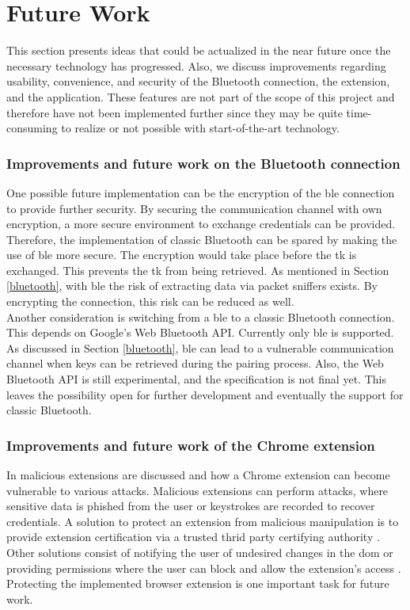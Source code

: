\section{Future Work} \label{futurework}
This section presents ideas that could be actualized in the near future once the necessary technology has progressed. Also, we discuss improvements regarding usability, convenience, and security of the Bluetooth connection, the extension, and the application. These features are not part of the scope of this project and therefore have not been implemented further since they may be quite time-consuming to realize or not possible with start-of-the-art technology.

\subsubsection*{Improvements and future work on the Bluetooth connection}
One possible future implementation can be the encryption of the \gls{ble} connection to provide further security. By securing the communication channel with own encryption, a more secure environment to exchange credentials can be provided. Therefore, the implementation of classic Bluetooth can be spared by making the use of \gls{ble} more secure. The encryption would take place before the \gls{tk} is exchanged. This prevents the \gls{tk} from being retrieved. As mentioned in Section \ref{bluetooth}, with \gls{ble} the risk of extracting data  via packet sniffers  exists. By encrypting the connection, this risk can be reduced as well. \\

Another consideration is switching from a \gls{ble} to a classic Bluetooth connection. This depends on Google's Web Bluetooth API. Currently only \gls{ble} is supported. As discussed in Section \ref{bluetooth}, \gls{ble} can lead to a vulnerable communication channel when keys can be retrieved during the pairing process. Also, the Web Bluetooth API is still experimental, and the specification is not final yet. This leaves the possibility open for further development and eventually the support for classic Bluetooth.
 
\subsubsection*{Improvements and future work of the Chrome extension}
In \cite{VarshneyBS18} malicious extensions are discussed and how a Chrome extension can become vulnerable to various attacks. Malicious extensions can perform attacks, where sensitive data is phished from the user or keystrokes are recorded to recover credentials. A solution to protect an extension from malicious manipulation is to provide extension certification via a trusted thrid party certifying authority \cite{VarshneyBS18}. Other solutions consist of notifying the user of undesired changes in the \gls{dom} or providing permissions where the user can block and allow the extension's access \cite{VarshneyBS18}. Protecting the implemented browser extension is one important task for future work. \\

